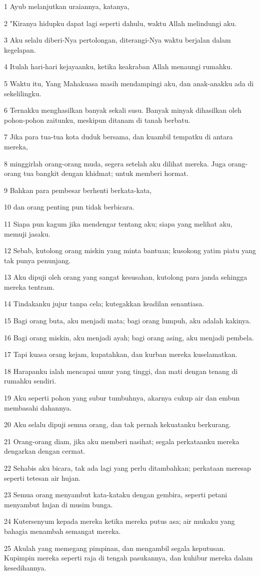 \par 1 Ayub melanjutkan uraiannya, katanya,
\par 2 "Kiranya hidupku dapat lagi seperti dahulu, waktu Allah melindungi aku.
\par 3 Aku selalu diberi-Nya pertolongan, diterangi-Nya waktu berjalan dalam kegelapan.
\par 4 Itulah hari-hari kejayaanku, ketika keakraban Allah menaungi rumahku.
\par 5 Waktu itu, Yang Mahakuasa masih mendampingi aku, dan anak-anakku ada di sekelilingku.
\par 6 Ternakku menghasilkan banyak sekali susu. Banyak minyak dihasilkan oleh pohon-pohon zaitunku, meskipun ditanam di tanah berbatu.
\par 7 Jika para tua-tua kota duduk bersama, dan kuambil tempatku di antara mereka,
\par 8 minggirlah orang-orang muda, segera setelah aku dilihat mereka. Juga orang-orang tua bangkit dengan khidmat; untuk memberi hormat.
\par 9 Bahkan para pembesar berhenti berkata-kata,
\par 10 dan orang penting pun tidak berbicara.
\par 11 Siapa pun kagum jika mendengar tentang aku; siapa yang melihat aku, memuji jasaku.
\par 12 Sebab, kutolong orang miskin yang minta bantuan; kusokong yatim piatu yang tak punya penunjang.
\par 13 Aku dipuji oleh orang yang sangat kesusahan, kutolong para janda sehingga mereka tentram.
\par 14 Tindakanku jujur tanpa cela; kutegakkan keadilan senantiasa.
\par 15 Bagi orang buta, aku menjadi mata; bagi orang lumpuh, aku adalah kakinya.
\par 16 Bagi orang miskin, aku menjadi ayah; bagi orang asing, aku menjadi pembela.
\par 17 Tapi kuasa orang kejam, kupatahkan, dan kurban mereka kuselamatkan.
\par 18 Harapanku ialah mencapai umur yang tinggi, dan mati dengan tenang di rumahku sendiri.
\par 19 Aku seperti pohon yang subur tumbuhnya, akarnya cukup air dan embun membasahi dahannya.
\par 20 Aku selalu dipuji semua orang, dan tak pernah kekuatanku berkurang.
\par 21 Orang-orang diam, jika aku memberi nasihat; segala perkataanku mereka dengarkan dengan cermat.
\par 22 Sehabis aku bicara, tak ada lagi yang perlu ditambahkan; perkataan meresap seperti tetesan air hujan.
\par 23 Semua orang menyambut kata-kataku dengan gembira, seperti petani menyambut hujan di musim bunga.
\par 24 Kutersenyum kepada mereka ketika mereka putus asa; air mukaku yang bahagia menambah semangat mereka.
\par 25 Akulah yang memegang pimpinan, dan mengambil segala keputusan. Kupimpin mereka seperti raja di tengah pasukannya, dan kuhibur mereka dalam kesedihannya.

